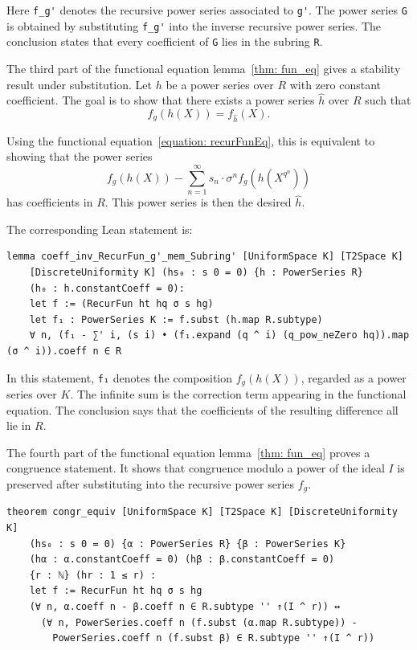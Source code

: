 Here \lstinline|f_g'| denotes the recursive power series associated to
\lstinline|g'|.  The power series \lstinline|G| is obtained by substituting
\lstinline|f_g'| into the inverse recursive power series.  The conclusion
states that every coefficient of \lstinline|G| lies in the subring
\lstinline|R|.

The third part of the functional equation lemma~\ref{thm: fun_eq} gives a
stability result under substitution.  Let $h$
be a power series over $R$ with zero constant coefficient.  The goal is to show
that there exists a power series $\hat{h}$ over $R$ such that
\[
  f_g(h(X)) = f_{\hat{h}}(X).
\]

Using the functional equation~\eqref{equation: recurFunEq}, this is equivalent to showing that the
power series
\[
  f_g(h(X)) -
  \sum_{n=1}^{\infty}
    s_n \cdot \sigma^n f_g(h(X^{q^n}))
\]
has coefficients in $R$.  This power series is then the desired
$\hat{h}$.

The corresponding Lean statement is:

\begin{lstlisting}
lemma coeff_inv_RecurFun_g'_mem_Subring' [UniformSpace K] [T2Space K]
    [DiscreteUniformity K] (hs₀ : s 0 = 0) {h : PowerSeries R}
    (h₀ : h.constantCoeff = 0):
    let f := (RecurFun ht hq σ s hg)
    let f₁ : PowerSeries K := f.subst (h.map R.subtype)
    ∀ n, (f₁ - ∑' i, (s i) • (f₁.expand (q ^ i) (q_pow_neZero hq)).map (σ ^ i)).coeff n ∈ R
\end{lstlisting}

In this statement, \lstinline|f₁| denotes the composition $f_g(h(X))$,
regarded as a power series over $K$.  The infinite sum is the correction
term appearing in the functional equation.  The conclusion says that the
coefficients of the resulting difference all lie in $R$.

The fourth part of the functional equation lemma~\ref{thm: fun_eq}
proves a congruence statement.  It shows that congruence modulo a power of
the ideal $I$ is preserved after substituting into the recursive power
series $f_g$.

\begin{lstlisting}
theorem congr_equiv [UniformSpace K] [T2Space K] [DiscreteUniformity K]
    (hs₀ : s 0 = 0) {α : PowerSeries R} {β : PowerSeries K}
    (hα : α.constantCoeff = 0) (hβ : β.constantCoeff = 0)
    {r : ℕ} (hr : 1 ≤ r) :
    let f := RecurFun ht hq σ s hg
    (∀ n, α.coeff n - β.coeff n ∈ R.subtype '' ↑(I ^ r)) ↔
      (∀ n, PowerSeries.coeff n (f.subst (α.map R.subtype)) -
        PowerSeries.coeff n (f.subst β) ∈ R.subtype '' ↑(I ^ r))
\end{lstlisting}

